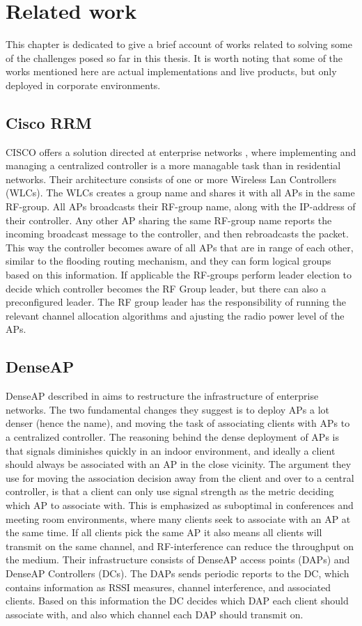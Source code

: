 \chapter{Related work}
This chapter is dedicated to give a brief account of works related to solving some of the challenges posed so far in this thesis. It is worth noting that some of the 
works mentioned here are actual implementations and live products, but only deployed in corporate environments.

\section{Cisco RRM}
CISCO offers a solution directed at enterprise networks \cite{ciscoRRM}, where implementing and managing a centralized
controller is a more managable task than in residential networks.
Their architecture consists of one or more Wireless Lan Controllers (WLCs).
The WLCs creates a group name and shares it with all APs in the same RF-group. All APs broadcasts their RF-group name, along
with the IP-address of their controller. Any other AP sharing the same RF-group name reports the incoming broadcast message to the controller, and then rebroadcasts the packet.  This way the controller
becomes aware of all APs that are in range of each other, similar to the flooding routing mechanism,
and they can form logical groups based on this information.
If applicable the RF-groups perform leader election to decide which controller becomes the RF Group leader, but there
can also a preconfigured leader. The RF group leader has the responsibility of running the relevant channel allocation
algorithms and ajusting the radio power level of the APs. 

\section{DenseAP}
DenseAP described in \cite{Murty2} aims to restructure the infrastructure of enterprise networks.  The two fundamental
changes they suggest is to deploy APs a lot denser (hence the name), and moving the task of associating clients
with APs to a centralized controller. The reasoning behind the dense deployment of APs is that signals diminishes
quickly in an indoor environment, and ideally a client should always be associated with an AP in the close vicinity. The argument 
they use for moving the association decision away from the client and over to a central controller, is that a client can
only use signal strength as the metric deciding which AP to associate with. This is emphasized as
suboptimal in conferences and meeting room environments, where many clients seek to associate with an AP at the same time.
If all clients pick the same AP it also means all clients will transmit on the same channel,
and RF-interference can reduce the throughput on the medium. 
Their infrastructure consists of DenseAP access points (DAPs) and DenseAP Controllers (DCs). The DAPs sends periodic
reports to the DC, which contains information as RSSI measures, channel interference, and associated clients. Based on this
information the DC decides which DAP each client should associate with, and also which channel each DAP should transmit
on. 

